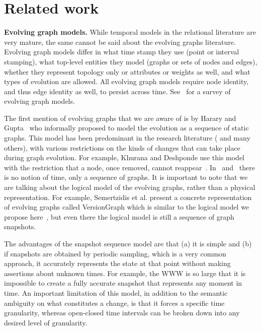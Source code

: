\section{Related work}
\label{sec:related}

{\bf Evolving graph models.}  While temporal models in the relational
literature are very mature, the same cannot be said about the evolving
graphs literature.  Evolving graph models differ in what time stamp
they use (point or interval stamping), what top-level entities they
model (graphs or sets of nodes and edges), whether they represent
topology only or attributes or weights as well, and what types of
evolution are allowed.  All evolving graph models require node
identity, and thus edge identity as well, to persist across time.
See~\cite{Zaki2016} for a survey of evolving graph models.

The first mention of evolving graphs that we are aware of is by Harary
and Gupta~\cite{Harary1997} who informally proposed to model the
evolution as a sequence of static graphs.  This model has been
predominant in the research literature
(\cite{Borgwardt2006,Fard2012,Ferreira2004,Kan2009,Khurana2013,Ren2011}
and many others), with various restrictions on the kinds of changes
that can take place during graph evolution.  For example, Khurana and
Deshponde use this model with the restriction that a node, once
removed, cannot reappear~\cite{Khurana2013}.  In~\cite{Fard2012}
and~\cite{Ren2011} there is no notion of time, only a sequence of
graphs.  It is important
to note that we are talking about the logical model of the evolving
graphs, rather than a physical representation.  For example,
Semertzidis et al. present a concrete representation of evolving
graphs called VersionGraph which is similar to the logical model we
propose here~\cite{Semertzidis2015}, but even there the logical model
is still a sequence of graph snapshots.

The advantages of the snapshot sequence model are that (a) it is
simple and (b) if snapshots are obtained by periodic sampling, which
is a very common approach, it accurately represents the state at that
point without making assertions about unknown times.  For example, the
WWW is so large that it is impossible to create a fully accurate
snapshot that represents any moment in time.  An important limitation
of this model, in addition to the semantic ambiguity on what
constitutes a change, is that it forces a specific time granularity,
whereas open-closed time intervals can be broken down into any desired
level of granularity.

